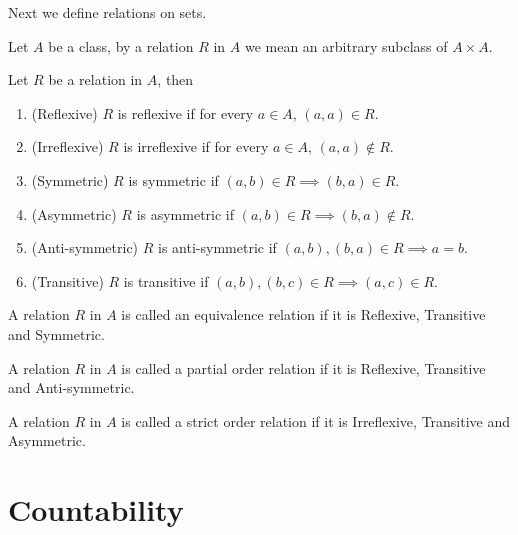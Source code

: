 Next we define relations on sets.
\begin{Definition}
    Let $A$ be a class, by a relation $R$ in $A$ we mean an arbitrary subclass of $A \times A$.
\end{Definition}
Let $R$ be a relation in $A$, then
\begin{enumerate}
    \item
	(Reflexive) $R$ is reflexive if for every $a \in A$, $(a,a) \in R$. 
    \item
	(Irreflexive) $R$ is irreflexive if for every $a \in A$, $(a,a) \not \in R$. 
    \item
	(Symmetric) $R$ is symmetric if $(a,b) \in R \implies (b,a) \in R$. 
    \item
	(Asymmetric) $R$ is asymmetric if $(a,b) \in R \implies (b,a) \not \in R$. 
    \item
	(Anti-symmetric) $R$ is anti-symmetric if $(a,b),(b,a) \in R \implies a=b $. 
    \item
	(Transitive) $R$ is transitive if $(a,b) ,(b,c) \in R \implies (a,c) \in R$. 
\end{enumerate}
\begin{Definition}
    A relation $R$ in $A$ is called an equivalence relation if it is Reflexive, Transitive and
    Symmetric.
\end{Definition}
\begin{Definition}
    A relation $R$ in $A$ is called a partial order relation if it is Reflexive, Transitive and
    Anti-symmetric.
\end{Definition}
\begin{Definition}
    A relation $R$ in $A$ is called a strict order relation if it is Irreflexive, Transitive and
    Asymmetric.
\end{Definition}

\section{Countability}
